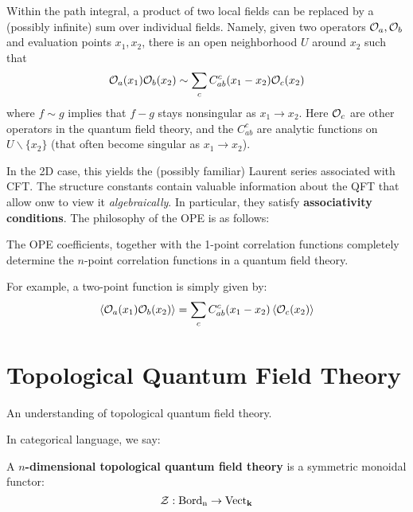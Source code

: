 		\begin{phys}
			 Within the path integral, a product of two local fields can be replaced by a (possibly infinite) sum over individual fields. Namely, given two operators $\mathcal{O}_a, \mathcal{O}_b$ and evaluation points $x_1, x_2$, there is an open neighborhood $U$ around $x_2$ such that
			\begin{equation}
				\mathcal{O}_a (x_1) \mathcal{O}_b(x_2) \sim \sum_c C_{ab}^c(x_1-x_2) \mathcal{O}_c(x_2)
			\end{equation}
			where $f \sim g$ implies that $f - g$ stays nonsingular as $x_1 \to x_2$.
		Here $\mathcal{O}_c$ are other operators in the quantum field theory, and the $C_{ab}^c$ are analytic functions on $U \backslash \{ x_2 \}$ (that often become singular as $x_1 \to x_2$). 
		\end{phys}
	
		In the 2D case, this yields the (possibly familiar) Laurent series associated with CFT. The structure constants contain valuable information about the QFT that allow onw to view it \emph{algebraically}. In particular, they satisfy \textbf{associativity conditions}. The philosophy of the OPE is as follows: %
		\begin{idea}
			The OPE coefficients, together with the 1-point correlation functions completely determine the $n$-point correlation functions in a quantum field theory. 
		\end{idea}
	\noindent 	For example, a two-point function is simply given by:
		\begin{equation}
			\left< \mathcal{O}_a(x_1) \mathcal{O}_b(x_2) \right> = \sum_c C^c_{ab}(x_1 - x_2) \left< \mathcal O_c (x_2) \right>
		\end{equation}
	
	
	
	\section{Topological Quantum Field Theory} %
	\label{sec:topological_quantum_field_theory}
	
	An understanding of topological quantum field theory. 
	
	In categorical language, we say:
	\begin{defn}
		A \textbf{$n$-dimensional topological quantum field theory} is a symmetric monoidal functor:
			\[
				\mathcal Z: \mathrm{Bord_n} \to \mathrm{Vect}_{\mathbf{k}}
			\]
	\end{defn} 
	
